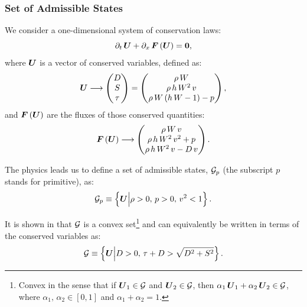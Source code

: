 \documentclass[10pt,preprint]{aastex}
\begin{document}
\subsubsection{Set of Admissible States}
We consider a one-dimensional system of conservation laws:
\begin{equation}
    \pd{\,\bU}{t} + \pd{\,\bF\left(\bU\right)}{x} = \vect{0},
\end{equation}
where $\bU$ is a vector of conserved variables, defined as:
\begin{equation}\label{Eq:ConservedVariables}
    \bU\longrightarrow\begin{pmatrix} D\\ S\\ \tau\end{pmatrix}=\begin{pmatrix} \rho\,W\\ \rho\,h\,W^{2}\,v\\ \rho\,W\left(h\,W-1\right)-p\end{pmatrix},
\end{equation}
and $\bF\left(\bU\right)$ are the fluxes of those conserved quantities:
\begin{equation}\label{Eq:FluxVector}
    \bF\left(\bU\right)\longrightarrow\begin{pmatrix}\rho\,W\,v\\ \rho\,h\,W^{2}\,v^{2}+p\\\rho\,h\,W^{2}\,v-D\,v\end{pmatrix}.
\end{equation}


The physics leads us to define a set of admissible states, $\cG_{p}$ (the subscript $p$ stands for primitive), as:
\begin{equation}
    \cG_{p}\equiv\left\{\bU\Big|\rho>0,\,p>0,\,v^{2}<1\right\}.
\end{equation}

It is shown in \citet{Mignone2005} that $\cG$ is a convex set\footnote{Convex in the sense that if $\bU_{1}\in\cG$ and $\bU_{2}\in\cG$, then $\alpha_{1}\,\bU_{1}+\alpha_{2}\,\bU_{2}\in\cG$, where $\alpha_{1},\,\alpha_{2}\in\left[0,1\right]$ and $\alpha_{1}+\alpha_{2}=1$.} and can equivalently be written in terms of the conserved variables as:
\begin{equation}\label{Eq:SetOfAdmissibleStates}
    \cG\equiv\left\{\bU\Big|D>0,\,\tau+D>\sqrt{D^{2}+S^{2}}\right\}.
\end{equation}
\end{document}
